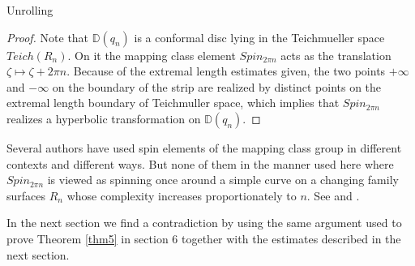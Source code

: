 \documentclass[12pt]{amsart}
\theoremstyle{remark}
\theoremstyle{definition}
\theoremstyle{definition}
\begin{document}
\begin{section}{Unrolling}
\begin{proof}
 Note that  ${\mathbb D}(q_n)$ is a conformal disc lying in the Teichmueller space $Teich(R_n).$  On it the mapping class element $Spin_{2 \pi n}$ acts as the translation $\zeta \mapsto \zeta + 2 \pi n.$   Because of the extremal length estimates given, the two points $+\infty$ and $-\infty$ on the boundary of the strip are realized by distinct points on the extremal length boundary of Teichmuller space, which implies that $Spin_{2 \pi n}$ realizes a hyperbolic transformation on ${\mathbb D}(q_n).$
 \end{proof}
 

 
 Several authors have used spin elements of the mapping class group in different contexts and different ways.  But none of them in the manner used here where $Spin_{2 \pi n}$ is viewed as spinning once around a simple curve on a changing family surfaces $R_n$ whose complexity increases proportionately to $n.$   See \cite{Birmanbook} and \cite{Kra8}. 
 
 In the next section we find a contradiction by using the same argument used to prove Theorem \ref{thm5} in section 6 together with the estimates described in the next section.  

 \end{section}
    
    
    
\end{document}
